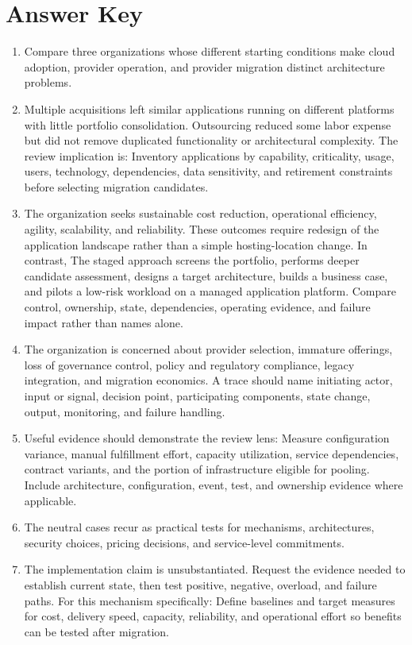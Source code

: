 \documentclass[11pt]{article}
\begin{document}
\section{Answer Key}
\begin{enumerate}
\item Compare three organizations whose different starting conditions make cloud adoption, provider operation, and provider migration distinct architecture problems.
\item Multiple acquisitions left similar applications running on different platforms with little portfolio consolidation. Outsourcing reduced some labor expense but did not remove duplicated functionality or architectural complexity. The review implication is: Inventory applications by capability, criticality, usage, users, technology, dependencies, data sensitivity, and retirement constraints before selecting migration candidates.
\item The organization seeks sustainable cost reduction, operational efficiency, agility, scalability, and reliability. These outcomes require redesign of the application landscape rather than a simple hosting-location change. In contrast, The staged approach screens the portfolio, performs deeper candidate assessment, designs a target architecture, builds a business case, and pilots a low-risk workload on a managed application platform. Compare control, ownership, state, dependencies, operating evidence, and failure impact rather than names alone.
\item The organization is concerned about provider selection, immature offerings, loss of governance control, policy and regulatory compliance, legacy integration, and migration economics. A trace should name initiating actor, input or signal, decision point, participating components, state change, output, monitoring, and failure handling.
\item Useful evidence should demonstrate the review lens: Measure configuration variance, manual fulfillment effort, capacity utilization, service dependencies, contract variants, and the portion of infrastructure eligible for pooling. Include architecture, configuration, event, test, and ownership evidence where applicable.
\item The neutral cases recur as practical tests for mechanisms, architectures, security choices, pricing decisions, and service-level commitments.
\item The implementation claim is unsubstantiated. Request the evidence needed to establish current state, then test positive, negative, overload, and failure paths. For this mechanism specifically: Define baselines and target measures for cost, delivery speed, capacity, reliability, and operational effort so benefits can be tested after migration.

\end{enumerate}
\end{document}
